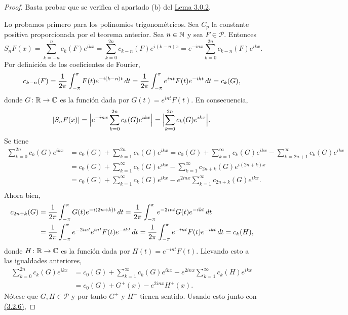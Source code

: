 \documentclass[a4paper, 12pt, oneside]{book}
\begin{document}
\begin{proof}
    Basta probar que se verifica el apartado (b) del \hyperref[3.0.2]{\color{blue}Lema 3.0.2}. 
    
    Lo probamos primero para los polinomios trigonométricos. Sea $C_p$ la constante positiva proporcionada por el teorema anterior. Sea $n \in \mathbb N$ y sea  $F \in \mathcal{P}$. Entonces
    \[S_nF(x) = \sum_{k=-n}^n c_k(F)e^{ikx} = \sum_{k=0}^{2n}c_{k-n}(F)e^{i(k-n)x} = e^{-inx}\sum_{k=0}^{2n}c_{k-n}(F)e^{ikx}.\]
    Por definición de los coeficientes de Fourier,
    \[c_{k-n}(F) = \frac{1}{2\pi}\int_{-\pi}^{\pi} F(t)e^{-i(k-n)t} \, dt = \frac{1}{2\pi}\int_{-\pi}^{\pi} e^{int}F(t)e^{-ikt} \, dt = c_k(G),\]
    donde $G \colon \mathbb R \to \mathbb C$ es la función dada por $G(t)=e^{int}F(t)$. En consecuencia,
    \begin{equation}\label{3.2.6}
    |S_nF(x)| = \Bigl|e^{-inx}\sum_{k=0}^{2n}c_k(G)e^{ikx}\Bigr|= \Bigl|\sum_{k=0}^{2n}c_k(G)e^{ikx}\Bigr|.
    \end{equation}
    Se tiene
    \begin{align*}
        \sum_{k=0}^{2n}c_k(G)e^{ikx} &= c_0(G)+ \sum_{k=1}^{2n} c_k(G)e^{ikx} = c_0(G)+\sum_{k=1}^{\infty} c_k(G)e^{ikx} - \sum_{k=2n+1}^{\infty} c_k(G)e^{ikx} \\
        &= c_0(G) + \sum_{k=1}^{\infty} c_k(G)e^{ikx} - \sum_{k=1}^{\infty} c_{2n+k}(G)e^{i(2n+k)x} \\
        &= c_0(G) + \sum_{k=1}^{\infty} c_k(G)e^{ikx} - e^{2inx}\sum_{k=1}^{\infty} c_{2n+k}(G)e^{ikx}. \\
    \end{align*}
    Ahora bien,
    \begin{align*}
        c_{2n+k}(G) &= \frac{1}{2\pi}\int_{-\pi}^{\pi} G(t)e^{-i(2n+k)t} \, dt = \frac{1}{2\pi}\int_{-\pi}^{\pi} e^{-2int}G(t)e^{-ikt} \, dt \\
        &=  \frac{1}{2\pi}\int_{-\pi}^{\pi} e^{-2int}e^{int}F(t)e^{-ikt} \, dt = \frac{1}{2\pi}\int_{-\pi}^{\pi} e^{-int}F(t)e^{-ikt} \, dt = c_k(H),
    \end{align*}
    donde $H \colon \mathbb R \to \mathbb C$ es la función dada por $H(t) = e^{-int}F(t)$. Llevando esto a las igualdades anteriores,
    \begin{align*}
        \sum_{k=0}^{2n}c_k(G)e^{ikx} &= c_0(G) + \sum_{k=1}^{\infty} c_k(G)e^{ikx} - e^{2inx}\sum_{k=1}^{\infty} c_k(H)e^{ikx} \\
        &= c_0(G) + G^+(x) - e^{2inx}H^+(x).
    \end{align*}
    Nótese que $G,H\in\mathcal{P}$ y por tanto $G^+$ y $H^+$ tienen sentido. Usando esto junto con \hyperref[3.2.6]{\color{blue}(3.2.6)},

\end{proof}
\end{document}
